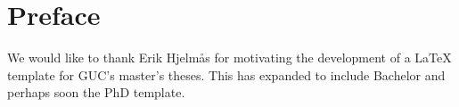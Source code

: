 \chapter*{Preface} %
\label{chap:preface}

We would like to thank Erik Hjelm\aa{}s for motivating the development of a \LaTeX{} template
 for GUC's master's theses.  This has expanded to include Bachelor and perhaps soon the PhD 
 template.
 
 

